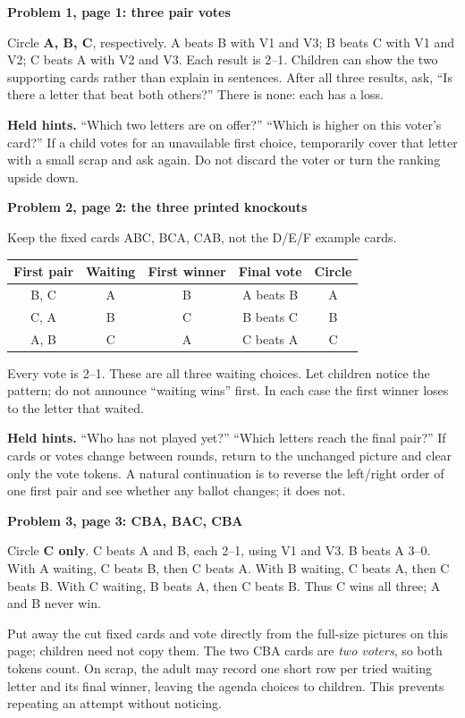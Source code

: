 \documentclass[11pt]{article}
\newcommand{\sub}[1]{\par\textbf{#1}\par}
\begin{document}
\sub{Problem 1, page 1: three pair votes}
Circle \textbf{A, B, C}, respectively. A beats B with V1 and V3; B beats C with V1 and V2; C beats A with V2 and V3. Each result is 2--1. Children can show the two supporting cards rather than explain in sentences. After all three results, ask, ``Is there a letter that beat both others?'' There is none: each has a loss.

\textbf{Held hints.} ``Which two letters are on offer?'' ``Which is higher on this voter's card?'' If a child votes for an unavailable first choice, temporarily cover that letter with a small scrap and ask again. Do not discard the voter or turn the ranking upside down.

\sub{Problem 2, page 2: the three printed knockouts}
Keep the fixed cards ABC, BCA, CAB, not the D/E/F example cards.
\begin{center}\renewcommand{\arraystretch}{1.18}
\begin{tabular}{ccccc}
First pair & Waiting & First winner & Final vote & Circle\\\midrule
B, C & A & B & A beats B & A\\
C, A & B & C & B beats C & B\\
A, B & C & A & C beats A & C
\end{tabular}\end{center}
Every vote is 2--1. These are all three waiting choices. Let children notice the pattern; do not announce ``waiting wins'' first. In each case the first winner loses to the letter that waited.

\textbf{Held hints.} ``Who has not played yet?'' ``Which letters reach the final pair?'' If cards or votes change between rounds, return to the unchanged picture and clear only the vote tokens. A natural continuation is to reverse the left/right order of one first pair and see whether any ballot changes; it does not.

\sub{Problem 3, page 3: CBA, BAC, CBA}
Circle \textbf{C only}. C beats A and B, each 2--1, using V1 and V3. B beats A 3--0. With A waiting, C beats B, then C beats A. With B waiting, C beats A, then C beats B. With C waiting, B beats A, then C beats B. Thus C wins all three; A and B never win.

Put away the cut fixed cards and vote directly from the full-size pictures on this page; children need not copy them. The two CBA cards are \emph{two voters}, so both tokens count. On scrap, the adult may record one short row per tried waiting letter and its final winner, leaving the agenda choices to children. This prevents repeating an attempt without noticing.
\end{document}
